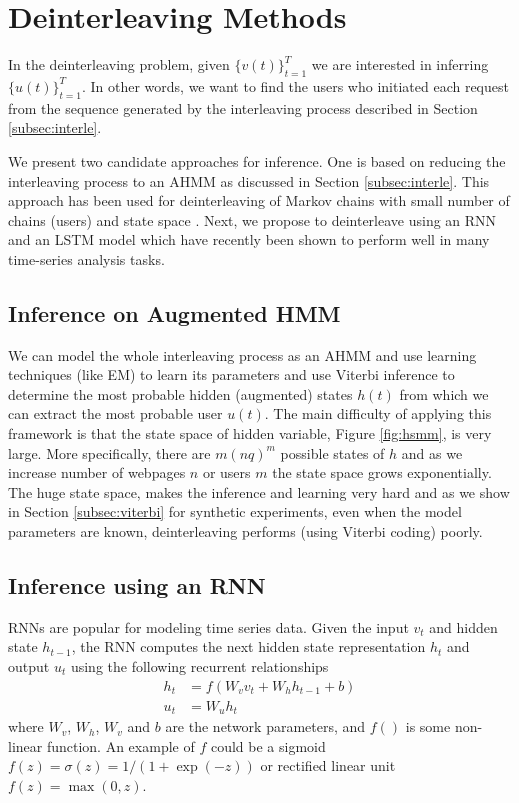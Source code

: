 \section{Deinterleaving Methods}
	In the deinterleaving problem, given $\{v(t)\}_{t=1}^T$ we are
        interested in inferring $\{u(t)\}_{t=1}^T$.  In other words,
        we want to find the users who initiated each request from the
        sequence generated by the interleaving process described in
        Section \ref{subsec:interle}.
	
	We present two candidate approaches for inference.  One is
        based on reducing the interleaving process to an AHMM as
        discussed in Section \ref{subsec:interle}.  This approach has
        been used for deinterleaving of Markov chains with small
        number of chains (users) and state space
        \cite{minot2014separation}.  Next, we propose to deinterleave
        using an RNN and an LSTM model which have recently been shown to 
        perform well in many time-series analysis tasks\cite{chung2014empirical,Hochreiter}.
	
	\subsection{Inference on Augmented HMM}
        We can model the whole interleaving process as an AHMM
        and use learning techniques (like
        EM) to learn its parameters and use Viterbi inference to
        determine the most probable hidden (augmented) states $h(t)$
        from which we can extract the most probable user $u(t)$.  The
        main difficulty of applying this framework is that the state
        space of hidden variable, Figure \ref{fig:hsmm}, is very
        large.  More specifically, there are $m (nq)^m$ possible
        states of $h$ and as we increase number of webpages $n$ or
        users $m$ the state space grows exponentially.  The huge state
        space, makes the inference and learning very hard and as we
        show in Section \ref{subsec:viterbi} for synthetic
        experiments, even when the model parameters are known,
        deinterleaving performs (using Viterbi coding) poorly.
	
	\subsection{Inference using an RNN}
        RNNs \cite{lecun2015deep} are popular for modeling time
        series data. Given the input $v_t$ and hidden state $h_{t-1}$,
        the RNN computes the next hidden state representation $h_t$
        and output $u_t$ using the following recurrent relationships
	\begin{align}
	\label{eq:rnn}
	h_{t} &= f(W_v v_{t} + W_h h_{t - 1} + b)\\
	u_t &= W_u h_t
	\end{align}
	where $W_v$, $W_h$, $W_v$ and $b$ are the network parameters, and $f()$ is some non-linear function. 
        An example of $f$ could be a sigmoid $f(z) = \sigma(z) = 1/(1+\exp(-z))$ or rectified linear unit $f(z) = \max(0,z)$. 
	
